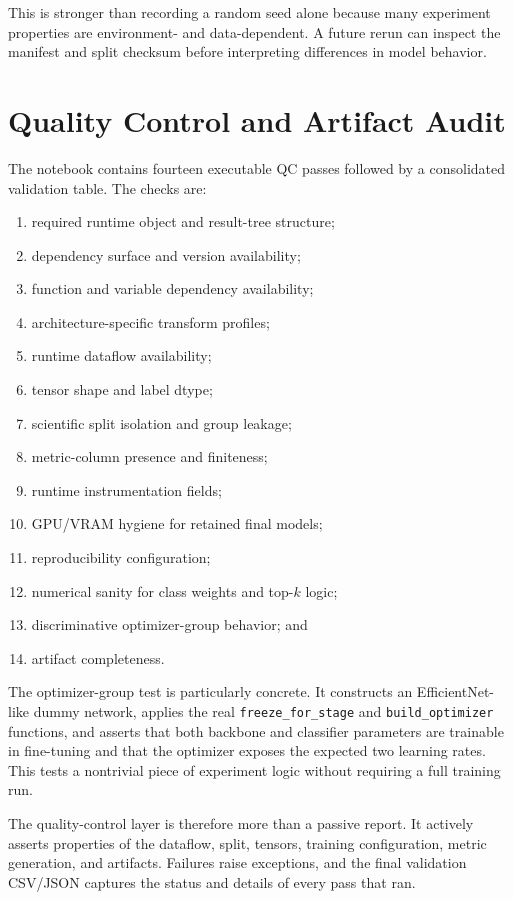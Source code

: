 \documentclass[11pt,a4paper]{article}
\begin{document}
This is stronger than recording a random seed alone because many experiment properties are environment- and data-dependent. A future rerun can inspect the manifest and split checksum before interpreting differences in model behavior.

\section{Quality Control and Artifact Audit}
The notebook contains fourteen executable QC passes followed by a consolidated validation table. The checks are:

\begin{enumerate}
\item required runtime object and result-tree structure;
\item dependency surface and version availability;
\item function and variable dependency availability;
\item architecture-specific transform profiles;
\item runtime dataflow availability;
\item tensor shape and label dtype;
\item scientific split isolation and group leakage;
\item metric-column presence and finiteness;
\item runtime instrumentation fields;
\item GPU/VRAM hygiene for retained final models;
\item reproducibility configuration;
\item numerical sanity for class weights and top-$k$ logic;
\item discriminative optimizer-group behavior; and
\item artifact completeness.
\end{enumerate}

The optimizer-group test is particularly concrete. It constructs an EfficientNet-like dummy network, applies the real \texttt{freeze\_for\_stage} and \texttt{build\_optimizer} functions, and asserts that both backbone and classifier parameters are trainable in fine-tuning and that the optimizer exposes the expected two learning rates. This tests a nontrivial piece of experiment logic without requiring a full training run.

The quality-control layer is therefore more than a passive report. It actively asserts properties of the dataflow, split, tensors, training configuration, metric generation, and artifacts. Failures raise exceptions, and the final validation CSV/JSON captures the status and details of every pass that ran.
\end{document}
